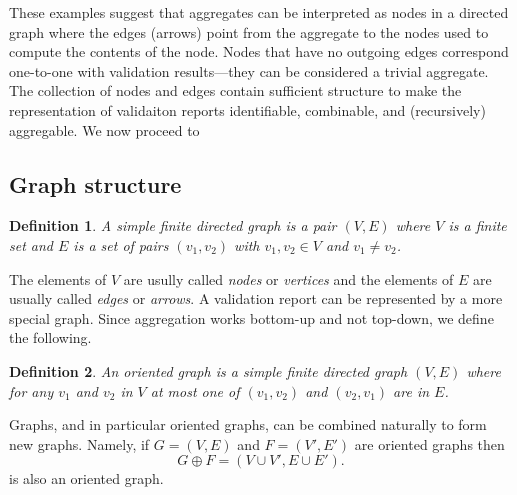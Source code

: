 \documentclass[a4paper, 11pt]{article}
\newtheorem{definition}{Definition}
\begin{document}
These examples suggest that aggregates can be interpreted as nodes in a
directed graph where the edges (arrows) point from the aggregate to the nodes
used to compute the contents of the node. Nodes that have no outgoing edges
correspond one-to-one with validation results---they can be considered a
trivial aggregate. The collection of nodes and edges contain sufficient
structure to make the representation of validaiton reports identifiable,
combinable, and (recursively) aggregable. We now proceed to 



\subsection{Graph structure}

\begin{definition}
A \emph{simple finite directed graph} is a pair  $(V,E)$ where $V$ is a finite set and $E$
is a set of pairs $(v_1,v_2)$ with $v_1,v_2\in V$ and $v_1\not=v_2$.
\end{definition}
The elements of $V$ are usully called \emph{nodes} or \emph{vertices} and the
elements of $E$ are usually called \emph{edges} or \emph{arrows}. A validation
report can be represented by a more special graph. Since aggregation works
bottom-up and not top-down, we define the following.
\begin{definition}
An \emph{oriented graph} is a simple finite directed graph $(V,E)$ where for any
$v_1$ and $v_2$ in $V$ at most one of $(v_1,v_2)$ and $(v_2,v_1)$ are in $E$.
\end{definition}
Graphs, and in particular oriented graphs, can be combined naturally to form
new graphs. Namely, if $G=(V,E)$ and $F=(V',E')$ are oriented graphs then
\begin{equation}
G\oplus F = (V\cup V', E\cup E').
\end{equation}
is also an oriented graph.










\end{document}
